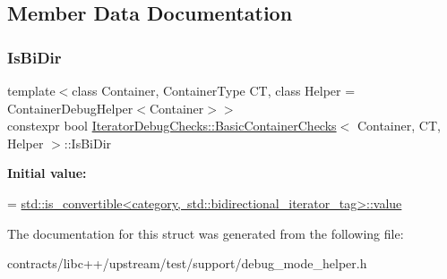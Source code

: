 \subsection{Member Data Documentation}
\mbox{\label{struct_iterator_debug_checks_1_1_basic_container_checks_a80cc784e8b10599f19a005655492944a}} 
\subsubsection{\texorpdfstring{Is\+Bi\+Dir}{IsBiDir}}
{\footnotesize\ttfamily template$<$class Container, Container\+Type CT, class Helper = Container\+Debug\+Helper$<$\+Container$>$$>$ \\
constexpr bool \mbox{\hyperlink{struct_iterator_debug_checks_1_1_basic_container_checks}{Iterator\+Debug\+Checks\+::\+Basic\+Container\+Checks}}$<$ Container, CT, Helper $>$\+::Is\+Bi\+Dir\hspace{0.3cm}{\ttfamily [static]}}

{\bfseries Initial value\+:}
\begin{DoxyCode}
=
      \mbox{\hyperlink{namespacewebsocketpp_1_1close_1_1status_a8614a5c4733d708e2d2a32191c5bef84}{std::is\_convertible<category, std::bidirectional\_iterator\_tag>::value}}
\end{DoxyCode}


The documentation for this struct was generated from the following file\+:\begin{DoxyCompactItemize}
\item 
contracts/libc++/upstream/test/support/debug\+\_\+mode\+\_\+helper.\+h\end{DoxyCompactItemize}

